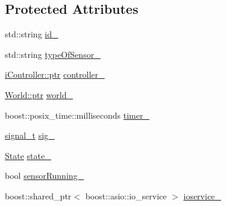 \subsection*{Protected Attributes}
\begin{DoxyCompactItemize}
\item 
std\+::string \hyperlink{classo_cpt_1_1i_sensor_a4c9bd54d193ec8f2cc01eede5eadacdc}{id\+\_\+}
\item 
std\+::string \hyperlink{classo_cpt_1_1i_sensor_a37396b5c63f5e99cb6e80c266f85dbfa}{type\+Of\+Sensor\+\_\+}
\item 
\hyperlink{classo_cpt_1_1i_controller_a6d89a95cd6ad68bb74adfaca2f36370f}{i\+Controller\+::ptr} \hyperlink{classo_cpt_1_1i_sensor_a65e41d8be53d71b1db21bac89c5c3c0d}{controller\+\_\+}
\item 
\hyperlink{classo_cpt_1_1_world_aa6e591e3096d5de71e0cec9039663d67}{World\+::ptr} \hyperlink{classo_cpt_1_1i_sensor_aab033b6462d7e8710c006f19c51e033e}{world\+\_\+}
\item 
boost\+::posix\+\_\+time\+::milliseconds \hyperlink{classo_cpt_1_1i_sensor_ac2a089853910118f6b490c00fc354d77}{timer\+\_\+}
\item 
\hyperlink{classo_cpt_1_1i_sensor_a2e6d170acbc05f0b557bb68671813f6d}{signal\+\_\+t} \hyperlink{classo_cpt_1_1i_sensor_a4f4943cf2af0b1a06bf5f0d8c46d1cb8}{sig\+\_\+}
\item 
\hyperlink{structo_cpt_1_1i_sensor_1_1_state}{State} \hyperlink{classo_cpt_1_1i_sensor_ad27fe02a89f013951a05f296ec457a08}{state\+\_\+}
\item 
bool \hyperlink{classo_cpt_1_1i_sensor_acc8826907fbe0c20c38a1e478e6a7c05}{sensor\+Running\+\_\+}
\item 
boost\+::shared\+\_\+ptr$<$ boost\+::asio\+::io\+\_\+service $>$ \hyperlink{classo_cpt_1_1i_sensor_a7aa3b0cea67ca97dae2495a20f5f6a04}{ioservice\+\_\+}
\end{DoxyCompactItemize}


